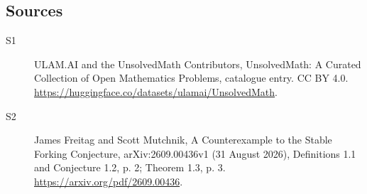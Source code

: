\documentclass[11pt]{article}
\begin{document}
\subsection{Sources}
\begin{description}
\item[\hypertarget{source:statement:1}{S1}] ULAM.AI and the UnsolvedMath Contributors, UnsolvedMath: A Curated Collection of Open Mathematics Problems, catalogue entry. CC BY 4.0. \url{https://huggingface.co/datasets/ulamai/UnsolvedMath}.
\item[\hypertarget{source:statement:2}{S2}] James Freitag and Scott Mutchnik, A Counterexample to the Stable Forking Conjecture, arXiv:2609.00436v1 (31 August 2026), Definitions 1.1 and Conjecture 1.2, p. 2; Theorem 1.3, p. 3. \url{https://arxiv.org/pdf/2609.00436}.
\end{description}
\label{end:statement}
\end{document}
